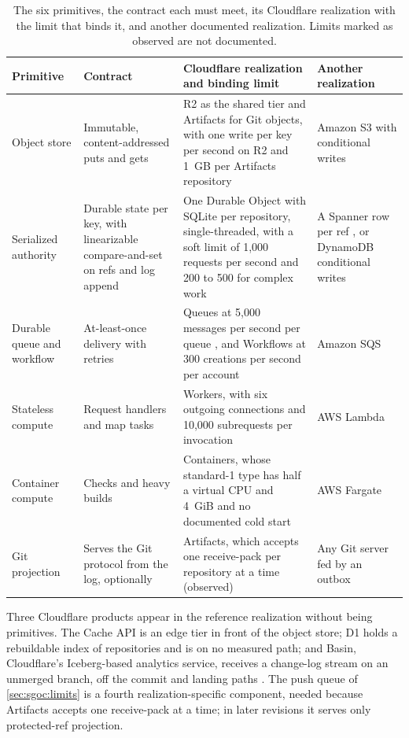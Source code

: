 \documentclass[11pt,letterpaper]{article}
\theoremstyle{definition}
\theoremstyle{remark}
\begin{document}
\begin{table}[t]
\centering
\caption{The six primitives, the contract each must meet, its Cloudflare realization with the limit that binds it, and another documented realization. Limits marked as observed are not documented.}
\label{tab:sgoc:mapping}
\small
\begin{tabularx}{\textwidth}{@{}L{2.2cm}L{3.3cm}YL{2.4cm}@{}}
\toprule
Primitive & Contract & Cloudflare realization and binding limit & Another realization \\
\midrule
Object store & Immutable, content-addressed puts and gets & R2 as the shared tier and Artifacts for Git objects, with one write per key per second on R2 \cite{cfr2limits} and 1~GB per Artifacts repository \cite{cfartifacts} & Amazon S3 with conditional writes \cite{awss3conditional} \\
Serialized authority & Durable state per key, with linearizable compare-and-set on refs and log append & One Durable Object with SQLite per repository, single-threaded, with a soft limit of 1,000 requests per second and 200 to 500 for complex work \cite{cfdolimits,cfdorules} & A Spanner row per ref \cite{corbett2012spanner}, or DynamoDB conditional writes \cite{awsdynamodbcond} \\
Durable queue and workflow & At-least-once delivery with retries & Queues at 5,000 messages per second per queue \cite{cfqueues}, and Workflows at 300 creations per second per account \cite{cfworkflows} & Amazon SQS \cite{awssqs} \\
Stateless compute & Request handlers and map tasks & Workers, with six outgoing connections and 10,000 subrequests per invocation \cite{cfworkerslimits} & AWS Lambda \cite{awslambda} \\
Container compute & Checks and heavy builds & Containers, whose standard-1 type has half a virtual CPU and 4~GiB and no documented cold start \cite{cfcontainers} & AWS Fargate \cite{awsfargate} \\
Git projection & Serves the Git protocol from the log, optionally & Artifacts, which accepts one receive-pack per repository at a time (observed) & Any Git server fed by an outbox \cite{gitprotocol} \\
\bottomrule
\end{tabularx}
\end{table}

Three Cloudflare products appear in the reference realization without being primitives. The Cache API is an edge tier in front of the object store; D1 holds a rebuildable index of repositories and is on no measured path; and Basin, Cloudflare's Iceberg-based analytics service, receives a change-log stream on an unmerged branch, off the commit and landing paths \cite{cfbasin}. The push queue of \cref{sec:sgoc:limits} is a fourth realization-specific component, needed because Artifacts accepts one receive-pack at a time; in later revisions it serves only protected-ref projection.
\end{document}
